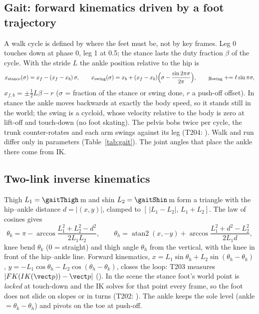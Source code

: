 \subsection{Gait: forward kinematics driven by a foot trajectory}
A walk cycle is defined by where the feet must be, not by key frames. Leg 0 touches down at phase 0, leg 1 at 0.5; the stance lasts the duty fraction $\beta$ of the cycle. With the stride $L$ the ankle position relative to the hip is
\begin{equation}
x_\text{stance}(\sigma)=x_f-(x_f-x_b)\,\sigma,\qquad
x_\text{swing}(\sigma)=x_b+(x_f-x_b)\Bigl(\sigma-\frac{\sin2\pi\sigma}{2\pi}\Bigr),\qquad y_\text{swing}\mathrel{+}=\ell\sin\pi\sigma,
\end{equation}
$x_{f,b}=\pm\tfrac12L\beta-r$ ($\sigma$ = fraction of the stance or swing done, $r$ a push-off offset). In stance the ankle moves backwards at exactly the body speed, so it stands still in the world; the swing is a cycloid, whose velocity relative to the body is zero at lift-off and touch-down (no foot skating). The pelvis bobs twice per cycle, the trunk counter-rotates and each arm swings against its leg (T204: ). Walk and run differ only in parameters (Table~\ref{tab:gait}). The joint angles that place the ankle there come from IK.
\begin{table}[h]
\centering\small
\caption{Gait parameters (generated from ).}\label{tab:gait}
\tabGait
\end{table}
\lstFootPath

\subsection{Two-link inverse kinematics}
Thigh $L_1=\gaitThigh$\,m and shin $L_2=\gaitShin$\,m form a triangle with the hip--ankle distance $d=|(x,y)|$, clamped to $[\,|L_1-L_2|,\,L_1+L_2]$. The law of cosines gives
\begin{equation}
\theta_k=\pi-\arccos\frac{L_1^2+L_2^2-d^2}{2L_1L_2},\qquad
\theta_h=\operatorname{atan2}(x,-y)+\arccos\frac{L_1^2+d^2-L_2^2}{2L_1d},
\end{equation}
knee bend $\theta_k$ (0 = straight) and thigh angle $\theta_h$ from the vertical, with the knee in front of the hip--ankle line. Forward kinematics, $x=L_1\sin\theta_h+L_2\sin(\theta_h-\theta_k)$, $y=-L_1\cos\theta_h-L_2\cos(\theta_h-\theta_k)$, closes the loop: T203 measures $|FK(IK(\vect p))-\vect p|$ (). In the scene the stance foot's world point is \emph{locked} at touch-down and the IK solves for that point every frame, so the foot does not slide on slopes or in turns (T202: ). The ankle keeps the sole level (ankle $=\theta_k-\theta_h$) and pivots on the toe at push-off.
\lstLegIK

